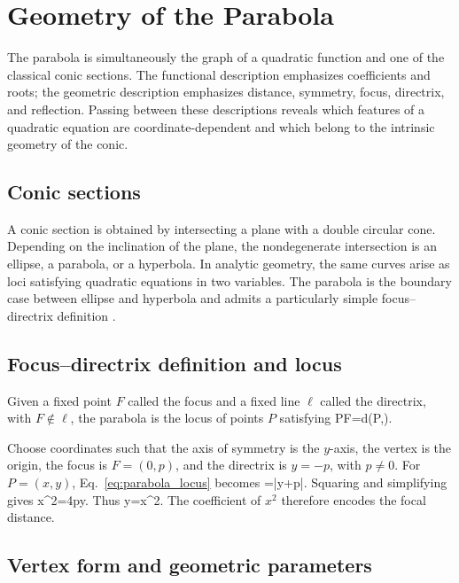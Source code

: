 \section{Geometry of the Parabola}

The parabola is simultaneously the graph of a quadratic function and one of the classical conic sections. The functional description emphasizes coefficients and roots; the geometric description emphasizes distance, symmetry, focus, directrix, and reflection. Passing between these descriptions reveals which features of a quadratic equation are coordinate-dependent and which belong to the intrinsic geometry of the conic.

\subsection{Conic sections}

A conic section is obtained by intersecting a plane with a double circular cone. Depending on the inclination of the plane, the nondegenerate intersection is an ellipse, a parabola, or a hyperbola. In analytic geometry, the same curves arise as loci satisfying quadratic equations in two variables. The parabola is the boundary case between ellipse and hyperbola and admits a particularly simple focus--directrix definition \cite{coxeter1969}.

\subsection{Focus--directrix definition and locus}

\begin{definition}[Parabola]
Given a fixed point $F$ called the focus and a fixed line $\ell$ called the directrix, with $F\notin\ell$, the parabola is the locus of points $P$ satisfying
\be
PF=d(P,\ell).
\ee
\end{definition}

Choose coordinates such that the axis of symmetry is the $y$-axis, the vertex is the origin, the focus is $F=(0,p)$, and the directrix is $y=-p$, with $p\neq0$. For $P=(x,y)$, Eq.~\eqref{eq:parabola_locus} becomes
\be
{}=|y+p|.
\ee
Squaring and simplifying gives
\be
x^2=4py.
\ee
Thus
\be
y=x^2.
\ee
The coefficient of $x^2$ therefore encodes the focal distance.

\subsection{Vertex form and geometric parameters}

